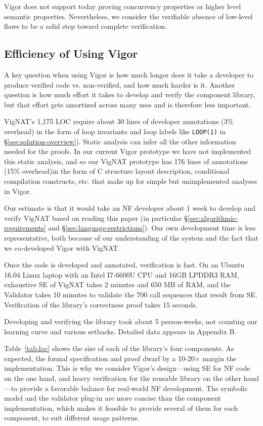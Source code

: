 \documentclass[letterpaper,twocolumn,10pt]{article}
\newcommand{\code}[1]{\lstinline{#1}}
\newcommand{\vignat}{{\sc VigNAT}\xspace}
\begin{document}
Vigor does not support today proving concurrency properties or higher level semantic properties. Nevertheless, we consider the verifiable absence of low-level flaws to be a solid step toward complete verification.

\subsection{Efficiency of Using Vigor}
\label{sec:efficiency}

A key question when using Vigor is how much longer does it take a developer to produce verified code vs. non-verified, and how much harder is it.  Another question is how much effort it takes to develop and verify the component library, but that effort gets amortized across many uses and is therefore less important.

\vignat's 1,175 LOC require about 30 lines of developer annotations (3\% overhead) in the form of loop invariants and loop labels like \code{LOOP(1)} in \S\ref{sec:solution-overview}). Static analysis can infer all the other information needed for the proofs. In our current Vigor prototype we have not implemented this static analysis, and so our \vignat prototype has 176 lines of annotations (15\% overhead)in the form of C structure layout description, conditional compilation constructs, etc. that make up for simple but unimplemented analyses in Vigor.

Our estimate is that it would take an NF developer about 1 week to develop and verify \vignat based on reading this paper (in particular \S\ref{sec:algorithmic-requirements} and \S\ref{sec:language-restrictions}). Our own development time is less representative, both because of our understanding of the system and the fact that we co-developed Vigor with \vignat.

Once the code is developed and annotated, verification is fast. On an Ubuntu 16.04 Linux laptop with an Intel I7-6600U CPU and 16GB LPDDR3 RAM, exhaustive SE of \vignat takes 2 minutes and 650 MB of RAM, and the Validator takes 10 minutes to validate the 700 call sequences that result from SE. Verification of the library's correctness proof takes 15 seconds.

\medskip 

Developing and verifying the library took about 5 person-weeks, not counting our learning curve and various setbacks. Detailed data appears in Appendix B.

Table~\ref{tab:loc} shows the size of each of the library's four components.  As expected, the formal specification and proof dwarf by a 10-20$\times$ margin the implementation.  This is why we consider Vigor's design---using SE for NF code on the one hand, and heavy verification for the reusable library on the other hand---to provide a favorable balance for real-world NF development.  The symbolic model and the validator plug-in are more concise than the component implementation, which makes it feasible to provide several of them for each component, to suit different usage patterns.
\end{document}
